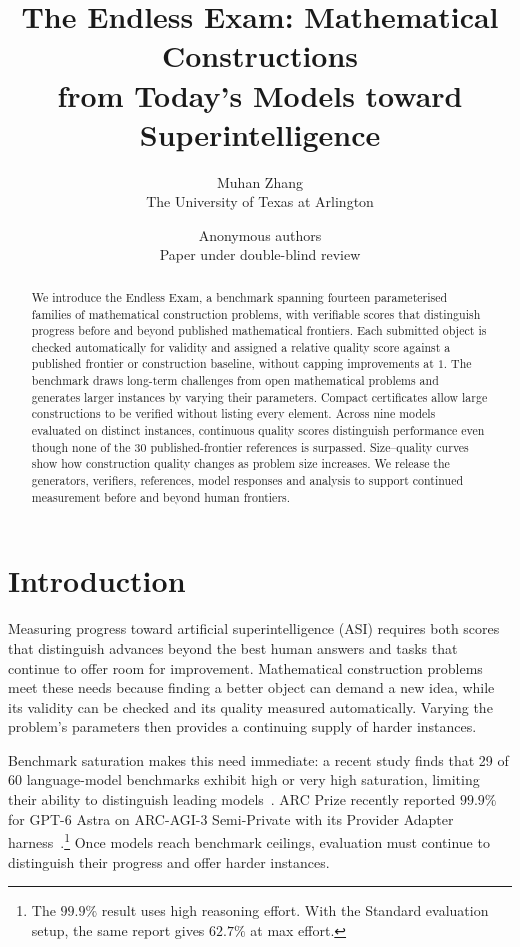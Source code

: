 \documentclass{article}
\title{The Endless Exam: Mathematical Constructions\\from Today's Models toward Superintelligence}
\author{Muhan Zhang\\The University of Texas at Arlington}
\author{Anonymous authors\\Paper under double-blind review}
\begin{document}
\maketitle
\ifdefined\EndlessExamPreprint
\lhead{}\renewcommand{\headrulewidth}{0pt}
\fi

\begin{abstract}
We introduce the Endless Exam, a benchmark spanning fourteen parameterised families of mathematical construction problems, with verifiable scores that distinguish progress before and beyond published mathematical frontiers. Each submitted object is checked automatically for validity and assigned a relative quality score against a published frontier or construction baseline, without capping improvements at $1$. The benchmark draws long-term challenges from open mathematical problems and generates larger instances by varying their parameters. Compact certificates allow large constructions to be verified without listing every element. Across nine models evaluated on \DistinctN{} distinct instances, continuous quality scores distinguish performance even though none of the 30 published-frontier references is surpassed. Size--quality curves show how construction quality changes as problem size increases. We release the generators, verifiers, references, model responses and analysis to support continued measurement before and beyond human frontiers.
\end{abstract}

\section{Introduction}

Measuring progress toward artificial superintelligence (ASI) requires both scores that distinguish advances beyond the best human answers and tasks that continue to offer room for improvement. Mathematical construction problems meet these needs because finding a better object can demand a new idea, while its validity can be checked and its quality measured automatically. Varying the problem's parameters then provides a continuing supply of harder instances.

Benchmark saturation makes this need immediate: a recent study finds that 29 of 60 language-model benchmarks exhibit high or very high saturation, limiting their ability to distinguish leading models~\citep{akhtar2026saturation}. ARC Prize recently reported $99.9\%$ for GPT-6 Astra on ARC-AGI-3 Semi-Private with its Provider Adapter harness~\citep{kamradt2026astra}.\footnote{The $99.9\%$ result uses high reasoning effort. With the Standard evaluation setup, the same report gives $62.7\%$ at max effort.} Once models reach benchmark ceilings, evaluation must continue to distinguish their progress and offer harder instances.
\end{document}
